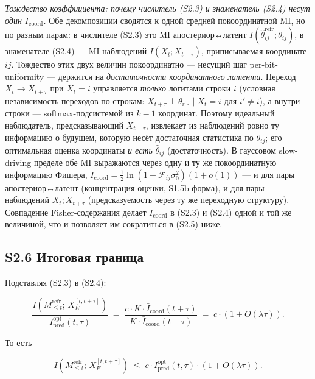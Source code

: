 \documentclass[pdflatex,sn-mathphys-ay]{sn-jnl}
\begin{document}
\emph{Тождество коэффициента: почему числитель (S2.3) и знаменатель (S2.4) несут один \(\bar I_{\text{coord}}\).} Обе декомпозиции сводятся к одной средней покоординатной MI, но по разным парам: в числителе (S2.3) это MI апостериор↔латент \(I(\hat\theta_{ij}^{\text{refr}};\theta_{ij})\), в знаменателе (S2.4) --- MI наблюдений \(I(X_t;X_{t+\tau})\), приписываемая координате \(ij\). Тождество этих двух величин покоординатно --- несущий шаг per-bit-uniformity --- держится на \emph{достаточности координатного латента}. Переход \(X_t \to X_{t+\tau}\) при \(X_t = i\) управляется \emph{только} логитами строки \(i\) (условная независимость переходов по строкам: \(X_{t+\tau} \perp \theta_{i'\cdot} \mid X_t = i\) для \(i' \ne i\)), а внутри строки --- softmax-подсистемой из \(k-1\) координат. Поэтому идеальный наблюдатель, предсказывающий \(X_{t+\tau}\), извлекает из наблюдений ровно ту информацию о будущем, которую несёт достаточная статистика по \(\theta_{ij}\); его оптимальная оценка координаты \emph{и есть} \(\hat\theta_{ij}\) (достаточность). В гауссовом slow-driving пределе обе MI выражаются через одну и ту же покоординатную информацию Фишера, \(I_{\text{coord}} = \tfrac12\ln(1 + \mathcal{F}_{ij}\sigma_0^2)(1+o(1))\) --- и для пары апостериор↔латент (концентрация оценки, S1.5b-форма), и для пары наблюдений \(X_t;X_{t+\tau}\) (предсказуемость через ту же переходную структуру). Совпадение Fisher-содержания делает \(\bar I_{\text{coord}}\) в (S2.3) и (S2.4) одной и той же величиной, что и позволяет им сократиться в (S2.5) ниже.



\subsection*{S2.6 Итоговая граница}\label{s2.6-ux438ux442ux43eux433ux43eux432ux430ux44f-ux433ux440ux430ux43dux438ux446ux430}



Подставляя (S2.3) в (S2.4):



\[\frac{I(M_{\le t}^{\text{refr}};\, X_E^{[t, t+\tau]})}{I_{\text{pred}}^{\text{opt}}(t, \tau)} \;=\; \frac{c \cdot K \cdot \bar I_{\text{coord}}(t+\tau)}{K \cdot \bar I_{\text{coord}}(t+\tau)} \;=\; c \cdot (1 + O(\lambda \tau)).\]



То есть



\begin{equation}I(M_{\le t}^{\text{refr}};\, X_E^{[t, t+\tau]}) \;\le\; c \cdot I_{\text{pred}}^{\text{opt}}(t, \tau) \cdot (1 + O(\lambda \tau)). \tag{S2.5}\end{equation}
\end{document}
